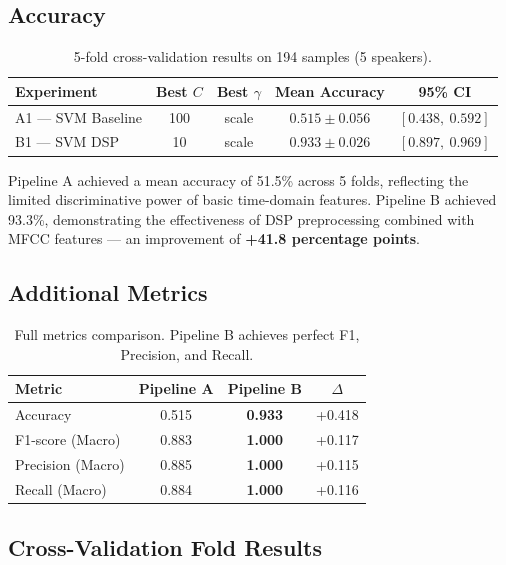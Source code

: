 \subsection{Accuracy}

\begin{table}[h]
\centering
\renewcommand{\arraystretch}{1.4}
\begin{tabular}{|l|c|c|c|c|}
\hline
\textbf{Experiment} & \textbf{Best $C$} & \textbf{Best $\gamma$} & \textbf{Mean Accuracy} & \textbf{95\% CI} \\
\hline
A1 --- SVM Baseline   & 100  & scale & $0.515 \pm 0.056$ & $[0.438,\ 0.592]$ \\
B1 --- SVM DSP        & 10   & scale & $\mathbf{0.933 \pm 0.026}$ & $[0.897,\ 0.969]$ \\
\hline
\end{tabular}
\caption{5-fold cross-validation results on 194 samples (5 speakers).}
\end{table}

Pipeline A achieved a mean accuracy of 51.5\% across 5 folds, reflecting the limited discriminative power of basic time-domain features. Pipeline B achieved 93.3\%, demonstrating the effectiveness of DSP preprocessing combined with MFCC features --- an improvement of \textbf{+41.8 percentage points}.

\subsection{Additional Metrics}

\begin{table}[h]
\centering
\renewcommand{\arraystretch}{1.4}
\begin{tabular}{|l|c|c|c|}
\hline
\textbf{Metric} & \textbf{Pipeline A} & \textbf{Pipeline B} & \textbf{$\Delta$} \\
\hline
Accuracy         & 0.515 & \textbf{0.933} & +0.418 \\
F1-score (Macro) & 0.883 & \textbf{1.000} & +0.117 \\
Precision (Macro)& 0.885 & \textbf{1.000} & +0.115 \\
Recall (Macro)   & 0.884 & \textbf{1.000} & +0.116 \\
\hline
\end{tabular}
\caption{Full metrics comparison. Pipeline B achieves perfect F1, Precision, and Recall.}
\end{table}

\subsection{Cross-Validation Fold Results}

